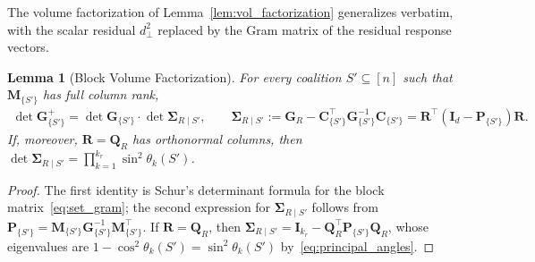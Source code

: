 \documentclass{article}
\newtheorem{lemma}[theorem]{Lemma}
\begin{document}
The volume factorization of Lemma~\ref{lem:vol_factorization} generalizes verbatim, with the scalar residual $d_{\perp}^2$ replaced by the Gram matrix of the residual response vectors.

\begin{lemma}[Block Volume Factorization]\label{lem:block_vol_factorization}
For every coalition $S' \subseteq [n]$ such that $\mathbf{M}_{\{S'\}}$ has full column rank,
\begin{align}
    \det \mathbf{G}^{+}_{\{S'\}} = \det \mathbf{G}_{\{S'\}} \cdot \det \boldsymbol{\Sigma}_{R \mid S'}, \qquad
    \boldsymbol{\Sigma}_{R \mid S'} := \mathbf{G}_R - \mathbf{C}_{\{S'\}}^\top \mathbf{G}_{\{S'\}}^{-1} \mathbf{C}_{\{S'\}} = \mathbf{R}^\top (\mathbf{I}_d - \mathbf{P}_{\{S'\}}) \mathbf{R}.
\end{align}
If, moreover, $\mathbf{R} = \mathbf{Q}_R$ has orthonormal columns, then $\det \boldsymbol{\Sigma}_{R \mid S'} = \prod_{k=1}^{k_r} \sin^2 \theta_k(S')$.
\end{lemma}

\begin{proof}
The first identity is Schur's determinant formula for the block matrix~\eqref{eq:set_gram}; the second expression for $\boldsymbol{\Sigma}_{R \mid S'}$ follows from $\mathbf{P}_{\{S'\}} = \mathbf{M}_{\{S'\}} \mathbf{G}_{\{S'\}}^{-1} \mathbf{M}_{\{S'\}}^\top$. If $\mathbf{R} = \mathbf{Q}_R$, then $\boldsymbol{\Sigma}_{R \mid S'} = \mathbf{I}_{k_r} - \mathbf{Q}_R^\top \mathbf{P}_{\{S'\}} \mathbf{Q}_R$, whose eigenvalues are $1 - \cos^2 \theta_k(S') = \sin^2 \theta_k(S')$ by~\eqref{eq:principal_angles}.
\end{proof}
\end{document}

